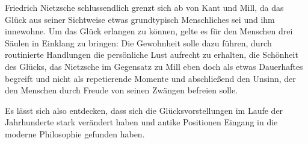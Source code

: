 Friedrich Nietzsche schlussendlich grenzt sich ab von Kant und Mill, da das Glück aus seiner Sichtweise etwas grundtypisch Menschliches sei und ihm innewohne. 
Um das Glück erlangen zu können, gelte es für den Menschen drei Säulen in Einklang zu bringen: 
Die Gewohnheit solle dazu führen, durch routinierte Handlungen die persönliche Lust aufrecht zu erhalten, die Schönheit des Glücks, das Nietzsche im Gegensatz zu Mill eben doch als etwas Dauerhaftes begreift und nicht als repetierende Momente und abschließend den Unsinn, der den Menschen durch Freude von seinen Zwängen befreien solle.

Es lässt sich also entdecken, dass sich die Glücksvorstellungen im Laufe der Jahrhunderte stark verändert haben und antike Positionen Eingang in die moderne Philosophie gefunden haben.